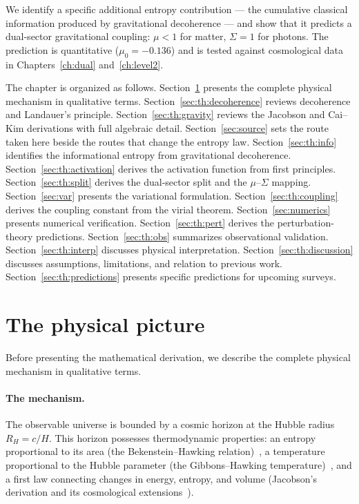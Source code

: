 We identify a specific additional entropy contribution --- the cumulative classical information produced by gravitational decoherence --- and show
that it predicts a dual-sector gravitational coupling: $\mu<1$ for matter, $\Sigma=1$ for photons. The prediction is quantitative ($\mu_0=-0.136$) and
is tested against cosmological data in Chapters~\ref{ch:dual} and~\ref{ch:level2}.

The chapter is organized as follows. Section~\ref{sec:th:picture} presents the complete physical mechanism in qualitative terms.
Section~\ref{sec:th:decoherence} reviews decoherence and Landauer's principle. Section~\ref{sec:th:gravity} reviews the Jacobson and Cai--Kim derivations with full
algebraic detail. Section~\ref{sec:source} sets the route taken here beside the routes that change the entropy law. Section~\ref{sec:th:info} identifies the
informational entropy from gravitational decoherence. Section~\ref{sec:th:activation} derives the activation function from first principles.
Section~\ref{sec:th:split} derives the dual-sector split and the $\mu$--$\Sigma$ mapping. Section~\ref{sec:var} presents the variational formulation.
Section~\ref{sec:th:coupling} derives the coupling constant from the virial theorem. Section~\ref{sec:numerics} presents numerical verification.
Section~\ref{sec:th:pert} derives the perturbation-theory predictions. Section~\ref{sec:th:obs} summarizes observational validation.
Section~\ref{sec:th:interp} discusses physical interpretation. Section~\ref{sec:th:discussion} discusses assumptions, limitations, and relation to previous
work. Section~\ref{sec:th:predictions} presents specific predictions for upcoming surveys.

\section{The physical picture}\label{sec:th:picture}
Before presenting the mathematical derivation, we describe the complete physical mechanism in qualitative terms.

\paragraph{The mechanism.} The observable universe is bounded by a cosmic horizon at the Hubble radius $R_H=c/H$. This horizon possesses thermodynamic
properties: an entropy proportional to its area (the Bekenstein--Hawking relation)~\cite{Bekenstein1973,Hawking1975}, a temperature proportional to the Hubble parameter (the
Gibbons--Hawking temperature)~\cite{GibbonsHawking1977}, and a first law connecting changes in energy, entropy, and volume (Jacobson's derivation and its cosmological
extensions~\cite{Jacobson1995,CaiKim2005}).

